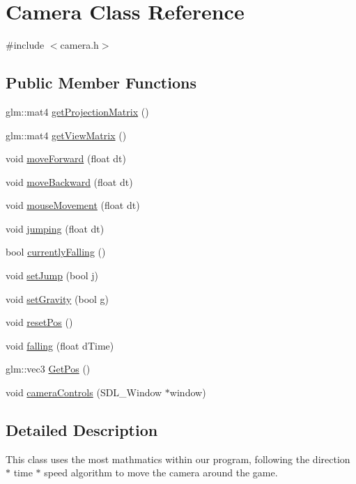 \hypertarget{classCamera}{\section{Camera Class Reference}
\label{classCamera}
}


{\ttfamily \#include $<$camera.\-h$>$}

\subsection*{Public Member Functions}
\begin{DoxyCompactItemize}
\item 
glm\-::mat4 \hyperlink{classCamera_adf09522521723786b9f405c99d6594c7}{get\-Projection\-Matrix} ()
\item 
glm\-::mat4 \hyperlink{classCamera_a5569ca5967e01d3344fbf6aba36d9820}{get\-View\-Matrix} ()
\item 
void \hyperlink{classCamera_a3be70f5bbcb806eb902a82dbb17e6bc3}{move\-Forward} (float dt)
\item 
void \hyperlink{classCamera_a3aa8d25c1e36af10fac1f749a1bb420e}{move\-Backward} (float dt)
\item 
void \hyperlink{classCamera_a4ec8b9654ae4fa6274920891321899b7}{mouse\-Movement} (float dt)
\item 
void \hyperlink{classCamera_a4d12c50b0d5306860f4e1493374e6fc9}{jumping} (float dt)
\item 
bool \hyperlink{classCamera_a08f5ef4dc4d503d539635a6bd80bd095}{currently\-Falling} ()
\item 
void \hyperlink{classCamera_a6889ceabc0a2d71fa0eb83268d628b94}{set\-Jump} (bool j)
\item 
void \hyperlink{classCamera_aea3ceffb4ff1a209995820e20910f21f}{set\-Gravity} (bool g)
\item 
void \hyperlink{classCamera_a6165c2b248c2675194dd6505b0099cf2}{reset\-Pos} ()
\item 
void \hyperlink{classCamera_ace63ab83e5ec884fee9d2acad85dde03}{falling} (float d\-Time)
\item 
glm\-::vec3 \hyperlink{classCamera_ab779e5b58cc0cddcd0738a13d82aa523}{Get\-Pos} ()
\item 
void \hyperlink{classCamera_a0edb621b581804dcd1ed129082045f7e}{camera\-Controls} (S\-D\-L\-\_\-\-Window $\ast$window)
\end{DoxyCompactItemize}


\subsection{Detailed Description}
This class uses the most mathmatics within our program, following the direction $\ast$ time $\ast$ speed algorithm to move the camera around the game. 

